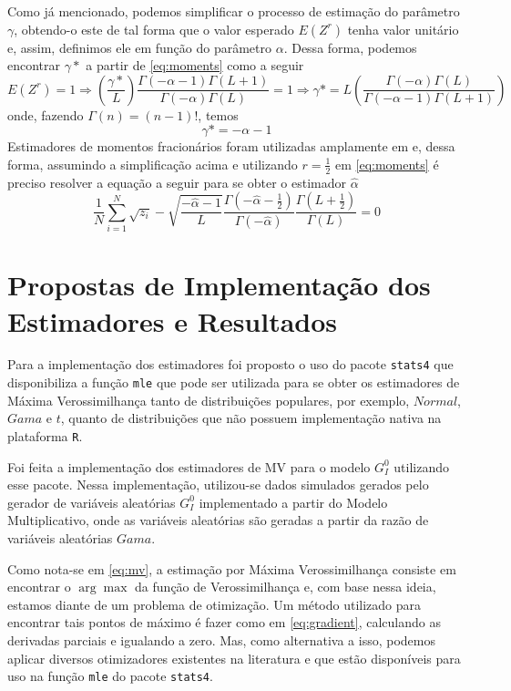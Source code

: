 \documentclass[12pt]{article}
\begin{document}
Como já mencionado, podemos simplificar o processo de estimação do parâmetro $\gamma$, obtendo-o este de tal forma que o valor esperado $E(Z^r)$ tenha valor unitário e, assim, definimos ele em função do parâmetro $\alpha$. Dessa forma, podemos encontrar $\gamma*$ a partir de \eqref{eq:moments} como a seguir
\begin{equation}
    E(Z^r) = 1 \Rightarrow \left (\frac{\gamma*}{L}\right ) \frac{\Gamma(-\alpha-1)\Gamma(L+1)}{\Gamma(-\alpha)\Gamma(L)} = 1 \Rightarrow \gamma* = L\left ( \frac{\Gamma(-\alpha)\Gamma(L)}{\Gamma(-\alpha-1)\Gamma(L+1)} \right ) 
\end{equation}
onde, fazendo $\Gamma(n) = (n-1)!$, temos
\begin{equation}
    \gamma* = -\alpha - 1
\end{equation}
Estimadores de momentos fracionários foram utilizadas amplamente em \citet{Clutter1997} e, dessa forma, assumindo a simplificação acima e utilizando $r=\frac{1}{2}$  em \eqref{eq:moments} é preciso resolver a equação a seguir para se obter o estimador $\widehat{\alpha}$
\begin{equation}
    \frac{1}{N}\sum_{i=1}^{N}\sqrt{z_i}-\sqrt{\frac{-\widehat{\alpha} - 1}{L}}\frac{\Gamma(-\widehat{\alpha} - \frac{1}{2})}{\Gamma(-\widehat{\alpha})}\frac{\Gamma(L+\frac{1}{2})}{\Gamma(L)} = 0
\end{equation}

\section{Propostas de Implementação dos Estimadores e Resultados}

Para a implementação dos estimadores foi proposto o uso do pacote \texttt{stats4} que disponibiliza a função \texttt{mle} que pode ser utilizada para se obter os estimadores de Máxima Verossimilhança tanto de distribuições populares, por exemplo, $Normal$, $Gama$ e $t$, quanto de distribuições que não possuem implementação nativa na plataforma \texttt{R}.

Foi feita a implementação dos estimadores de MV para o modelo $G_I^0$ utilizando esse pacote. Nessa implementação, utilizou-se dados simulados gerados pelo gerador de variáveis aleatórias $G_I^0$ implementado a partir do Modelo Multiplicativo, onde as variáveis aleatórias são geradas a partir da razão de variáveis aleatórias $Gama$.

Como nota-se em \eqref{eq:mv}, a estimação por Máxima Verossimilhança consiste em encontrar o $\arg\max$ da função de Verossimilhança e, com base nessa ideia, estamos diante de um problema de otimização. Um método utilizado para encontrar tais pontos de máximo é fazer como em \eqref{eq:gradient}, calculando as derivadas parciais e igualando a zero. Mas, como alternativa a isso, podemos aplicar diversos otimizadores existentes na literatura e que estão disponíveis para uso na função \texttt{mle} do pacote \texttt{stats4}.
\end{document}
